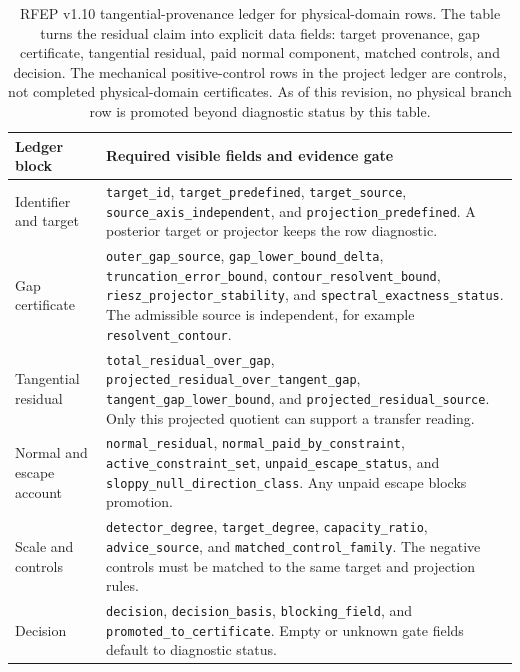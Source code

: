 \documentclass[11pt,a4paper]{article}
\theoremstyle{plain}
\theoremstyle{definition}
\begin{document}
\begin{table}[htbp]
\centering
\footnotesize
\begin{tabularx}{\textwidth}{L{0.27\textwidth}Y}
\toprule
Ledger block & Required visible fields and evidence gate \\
\midrule
Identifier and target & \texttt{target\_id},
\texttt{target\_predefined}, \texttt{target\_source},
\texttt{source\_axis\_independent}, and
\texttt{projection\_predefined}.  A posterior target or projector keeps
the row diagnostic. \\
Gap certificate & \texttt{outer\_gap\_source},
\texttt{gap\_lower\_bound\_delta},
\texttt{truncation\_error\_bound},
\texttt{contour\_resolvent\_bound},
\texttt{riesz\_projector\_stability}, and
\texttt{spectral\_exactness\_status}.  The admissible source is
independent, for example \texttt{resolvent\_contour}. \\
Tangential residual & \texttt{total\_residual\_over\_gap},
\texttt{projected\_residual\_over\_tangent\_gap},
\texttt{tangent\_gap\_lower\_bound}, and
\texttt{projected\_residual\_source}.  Only this projected quotient can
support a transfer reading. \\
Normal and escape account & \texttt{normal\_residual},
\texttt{normal\_paid\_by\_constraint},
\texttt{active\_constraint\_set},
\texttt{unpaid\_escape\_status}, and
\texttt{sloppy\_null\_direction\_class}.  Any unpaid escape blocks
promotion. \\
Scale and controls & \texttt{detector\_degree},
\texttt{target\_degree}, \texttt{capacity\_ratio},
\texttt{advice\_source}, and \texttt{matched\_control\_family}.  The
negative controls must be matched to the same target and projection
rules. \\
Decision & \texttt{decision}, \texttt{decision\_basis},
\texttt{blocking\_field}, and \texttt{promoted\_to\_certificate}.  Empty
or unknown gate fields default to diagnostic status. \\
\bottomrule
\end{tabularx}
\caption{RFEP v1.10 tangential-provenance ledger for physical-domain
rows.  The table turns the residual claim into explicit data fields:
target provenance, gap certificate, tangential residual, paid normal
component, matched controls, and decision.  The mechanical
positive-control rows in the project ledger are controls, not
completed physical-domain certificates.  As of this revision, no
physical branch row is promoted beyond diagnostic status by this
table.}
\label{tab:rfep-v19-ledger}
\end{table}
\end{document}
